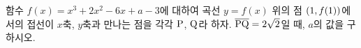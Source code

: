 함수 $f(x)=x^3+2x^2-6x+a-3$에 대하여 곡선 $y=f(x)$ 위의 점 $(1{,}\mkern3mu\mathopen{}f(1))$에서의 접선이 $x$축, $y$축과 만나는 점을 각각 $\mathrm{P}$, $\mathrm{Q}$라 하자. $\overline{\mathrm{PQ}}=2\sqrt{2}$일 때, $a$의 값을 구하시오. 
